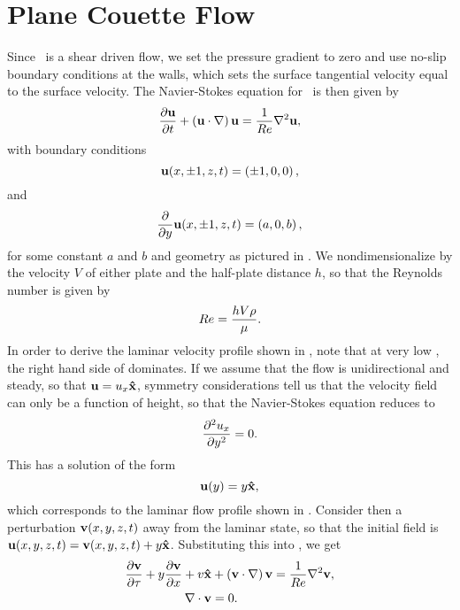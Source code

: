 \section{Plane Couette Flow}
Since \pCf\ is a shear driven flow, we set the pressure gradient to zero and use no-slip boundary conditions at the walls, which sets the surface tangential velocity equal to the surface velocity. The Navier-Stokes equation for \pCf\ is then given by 
\begin{equation}\label{eq:NSPCF}
\pder{1}{\Vector{u}}{t} + \paren{\Vector{u}\cdot\nabla}\Vector{u} = \frac{1}{\ReN}\nabla^2\Vector{u},
\end{equation}
with boundary conditions 
\begin{equation}\label{eq:PCBC}
\mathbf{u}(x,\pm1,z,t) = \left ( \pm1,0,0 \right ),
\end{equation}
and
\begin{equation}\label{eq:NPBC}
\pder{1}{}{y}\Vector{u}(x,\pm1,z,t) = \paren{a,0,b},
\end{equation}
for some constant $a$ and $b$ and geometry as pictured in . We nondimensionalize by the velocity $V$ of either plate and the half-plate distance $h$, so that the Reynolds number is given by
\begin{equation}
Re = \dfrac{hV\rho}{\mu}.
\end{equation} In order to derive the laminar velocity profile shown in , note that at very low \ReN, the right hand side of  dominates. If we assume that the flow is unidirectional and steady, so that $\mathbf{u} = u_x \mathbf{\hat{x}}$, symmetry considerations tell us that the velocity field can only be a function of height, so that the Navier-Stokes equation reduces to 
\begin{equation}
\pder{2}{u_x}{y} = 0.
\end{equation}
This has a solution of the form
\begin{equation}
\mathbf{u}(y) = y\mathbf{\hat{x}},
\end{equation}
which corresponds to the laminar flow profile shown in . Consider then a perturbation $\mathbf{v}(x,y,z,t)$ away from the laminar state, so that the initial field is $\mathbf{u}(x,y,z,t) = \mathbf{v} (x,y,z,t)+ y\mathbf{\hat{x}}$. Substituting this into , we get 
\begin{align}
\pder{1}{\Vector{v}}{\tau} + y\pder{1}{\Vector{v}}{x} + v\Vector{\hat{x}} &+ \paren{\Vector{v}\cdot\nabla}\Vector{v} = \frac{1}{\ReN} \nabla^2\Vector{v},\label{eq:PertND}\\
\Div{\Vector{v}} &= 0.
\end{align}
